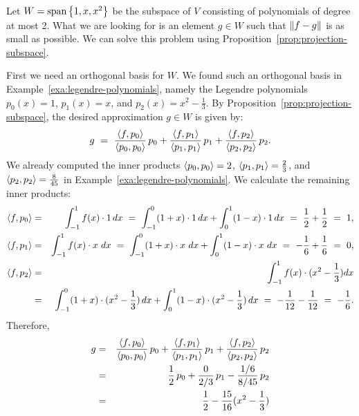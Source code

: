 \begin{solution}
  Let $W=\sspan\set{1,x,x^2}$ be the subspace of $V$ consisting of
  polynomials of degree at most 2. What we are looking for is an
  element $g\in W$ such that $\left\|f-g\right\|$ is as small as possible.  We
  can solve this problem using
  Proposition~\ref{prop:projection-subspace}.

  First we need an orthogonal basis for $W$. We found such an
  orthogonal basis in Example~\ref{exa:legendre-polynomials}, namely
  the Legendre polynomials $p_0(x) = 1$, $p_1(x) = x$, and
  $p_2(x) = x^2-\frac{1}{3}$.  By
  Proposition~\ref{prop:projection-subspace}, the desired
  approximation $g\in W$ is given by:
  \begin{equation*}
    g
    ~=~
    \frac{\langle f,p_0\rangle}{\langle p_0,p_0\rangle}\,p_0
    + \frac{\langle f,p_1\rangle}{\langle p_1,p_1\rangle}\,p_1
    + \frac{\langle f,p_2\rangle}{\langle p_2,p_2\rangle}\,p_2.
  \end{equation*}
  We already computed the inner products $\langle p_0,p_0\rangle=2$,
  $\langle p_1,p_1\rangle=\frac{2}{3}$, and $\langle p_2,p_2\rangle=\frac{8}{45}$ in
  Example~\ref{exa:legendre-polynomials}. We calculate the remaining
  inner products:
  \begin{eqnarray*}
    \langle f,p_0\rangle
    &=& \int_{-1}^{1} f(x)\cdot 1\,dx
        ~=~ \int_{-1}^{0} (1+x)\cdot 1\,dx
        +   \int_{0}^{1} (1-x)\cdot 1\,dx
        ~=~ \frac{1}{2} + \frac{1}{2}
        ~=~ 1, \\
    \langle f,p_1\rangle
    &=& \int_{-1}^{1} f(x)\cdot x\,\,dx
        ~=~ \int_{-1}^{0} (1+x)\cdot x\,\,dx
        +   \int_{0}^{1} (1-x)\cdot x\,\,dx
        ~=~ -\frac{1}{6} + \frac{1}{6}
        ~=~ 0, \\
    \langle f,p_2\rangle
    &=& \int_{-1}^{1} f(x)\cdot (x^2-\frac{1}{3}) dx \\
    &=& \int_{-1}^{0} (1+x)\cdot (x^2-\frac{1}{3})\,dx
        +   \int_{0}^{1} (1-x)\cdot (x^2-\frac{1}{3})\,dx
        ~=~ - \frac{1}{12} - \frac{1}{12}
        ~=~ -\frac{1}{6}.
  \end{eqnarray*}
  Therefore,
  \begin{eqnarray*}
    g
    &=&
    \frac{\iprod{f,p_0}}{\iprod{p_0,p_0}}\,p_0
        + \frac{\iprod{f,p_1}}{\iprod{p_1,p_1}}\,p_1
        + \frac{\iprod{f,p_2}}{\iprod{p_2,p_2}}\,p_2
    \\
    &=& \frac{1}{2}\,p_0
        + \frac{0}{2/3}\,p_1
        - \frac{1/6}{8/45}\,p_2
    \\
    &=& \frac{1}{2}
        - \frac{15}{16}(x^2-\frac{1}{3})
    \\

\end{eqnarray*}
\end{solution}
